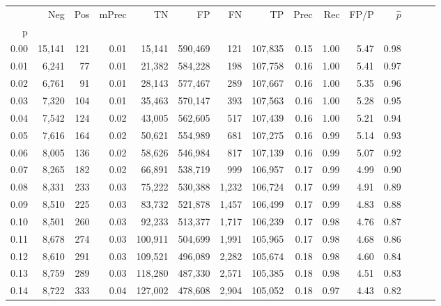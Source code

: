 \begin{tabular}{rrrrrrrrrrrrrrr}
\toprule
{} &     Neg &    Pos & mPrec &       TN &       FP &       FN &       TP &  Prec &   Rec &  FP/P & $\hat{p}$ \\
p    &         &        &       &          &          &          &          &       &       &       &           \\
\midrule
0.00 &  15,141 &    121 &  0.01 &   15,141 &  590,469 &      121 &  107,835 &  0.15 &  1.00 &  5.47 &      0.98 \\
0.01 &   6,241 &     77 &  0.01 &   21,382 &  584,228 &      198 &  107,758 &  0.16 &  1.00 &  5.41 &      0.97 \\
0.02 &   6,761 &     91 &  0.01 &   28,143 &  577,467 &      289 &  107,667 &  0.16 &  1.00 &  5.35 &      0.96 \\
0.03 &   7,320 &    104 &  0.01 &   35,463 &  570,147 &      393 &  107,563 &  0.16 &  1.00 &  5.28 &      0.95 \\
0.04 &   7,542 &    124 &  0.02 &   43,005 &  562,605 &      517 &  107,439 &  0.16 &  1.00 &  5.21 &      0.94 \\
0.05 &   7,616 &    164 &  0.02 &   50,621 &  554,989 &      681 &  107,275 &  0.16 &  0.99 &  5.14 &      0.93 \\
0.06 &   8,005 &    136 &  0.02 &   58,626 &  546,984 &      817 &  107,139 &  0.16 &  0.99 &  5.07 &      0.92 \\
0.07 &   8,265 &    182 &  0.02 &   66,891 &  538,719 &      999 &  106,957 &  0.17 &  0.99 &  4.99 &      0.90 \\
0.08 &   8,331 &    233 &  0.03 &   75,222 &  530,388 &    1,232 &  106,724 &  0.17 &  0.99 &  4.91 &      0.89 \\
0.09 &   8,510 &    225 &  0.03 &   83,732 &  521,878 &    1,457 &  106,499 &  0.17 &  0.99 &  4.83 &      0.88 \\
0.10 &   8,501 &    260 &  0.03 &   92,233 &  513,377 &    1,717 &  106,239 &  0.17 &  0.98 &  4.76 &      0.87 \\
0.11 &   8,678 &    274 &  0.03 &  100,911 &  504,699 &    1,991 &  105,965 &  0.17 &  0.98 &  4.68 &      0.86 \\
0.12 &   8,610 &    291 &  0.03 &  109,521 &  496,089 &    2,282 &  105,674 &  0.18 &  0.98 &  4.60 &      0.84 \\
0.13 &   8,759 &    289 &  0.03 &  118,280 &  487,330 &    2,571 &  105,385 &  0.18 &  0.98 &  4.51 &      0.83 \\
0.14 &   8,722 &    333 &  0.04 &  127,002 &  478,608 &    2,904 &  105,052 &  0.18 &  0.97 &  4.43 &      0.82 \\

\end{tabular}
